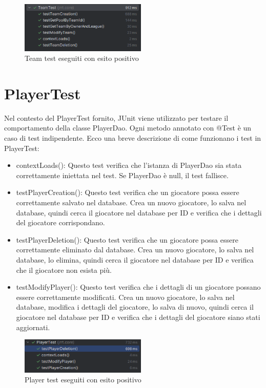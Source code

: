 \documentclass[twoside,openright,titlepage,fleqn,headinclude,12pt,a4paper,BCOR=5mm,footinclude]{scrbook}
\begin{document}
\begin{figure}[H] 
\centering \includegraphics[width=60mm]{images/teamTest.png} \caption{Team test eseguiti con esito positivo} \label{fig:teamTests} \end{figure}

\section{PlayerTest} 
Nel contesto del PlayerTest fornito, JUnit viene utilizzato per testare il comportamento della classe PlayerDao. Ogni metodo annotato con @Test è un caso di test indipendente. Ecco una breve descrizione di come funzionano i test in PlayerTest:  \begin{itemize} 
    \item contextLoads(): Questo test verifica che l'istanza di PlayerDao sia stata correttamente iniettata nel test. Se PlayerDao è null, il test fallisce. 
    \item testPlayerCreation(): Questo test verifica che un giocatore possa essere correttamente salvato nel database. Crea un nuovo giocatore, lo salva nel database, quindi cerca il giocatore nel database per ID e verifica che i dettagli del giocatore corrispondano. 
    \item testPlayerDeletion(): Questo test verifica che un giocatore possa essere correttamente eliminato dal database. Crea un nuovo giocatore, lo salva nel database, lo elimina, quindi cerca il giocatore nel database per ID e verifica che il giocatore non esista più. 
    \item testModifyPlayer(): Questo test verifica che i dettagli di un giocatore possano essere correttamente modificati. Crea un nuovo giocatore, lo salva nel database, modifica i dettagli del giocatore, lo salva di nuovo, quindi cerca il giocatore nel database per ID e verifica che i dettagli del giocatore siano stati aggiornati. 
\end{itemize}  
\begin{figure}[H] 
\centering \includegraphics[width=60mm]{images/playerTest.png} \caption{Player test eseguiti con esito positivo} \label{fig:playerTests} 
\end{figure}
\end{document}
